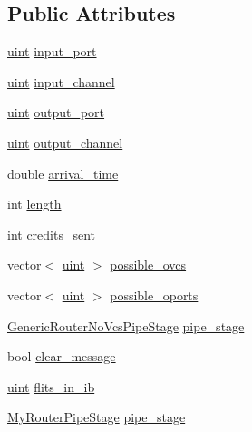 \subsection*{Public Attributes}
\begin{CompactItemize}
\item 
\hyperlink{outputBuffer_8h_91ad9478d81a7aaf2593e8d9c3d06a14}{uint} \hyperlink{classMessageState_e559b3e67832d9dadfa22e4d1e881f66}{input\_\-port}
\item 
\hyperlink{outputBuffer_8h_91ad9478d81a7aaf2593e8d9c3d06a14}{uint} \hyperlink{classMessageState_c3aa8bd6020f05968251f82ecc513e73}{input\_\-channel}
\item 
\hyperlink{outputBuffer_8h_91ad9478d81a7aaf2593e8d9c3d06a14}{uint} \hyperlink{classMessageState_c2c10a29b3f589757b00648e886d656b}{output\_\-port}
\item 
\hyperlink{outputBuffer_8h_91ad9478d81a7aaf2593e8d9c3d06a14}{uint} \hyperlink{classMessageState_504a771d0ecbe3c1a8abb105ce3d24b8}{output\_\-channel}
\item 
double \hyperlink{classMessageState_a0e6516b0f5557c9ab36172cebc34483}{arrival\_\-time}
\item 
int \hyperlink{classMessageState_d42d02c6268b0f589c411a328df27741}{length}
\item 
int \hyperlink{classMessageState_dc0b600f04abf68ec43182d229030f2e}{credits\_\-sent}
\item 
vector$<$ \hyperlink{outputBuffer_8h_91ad9478d81a7aaf2593e8d9c3d06a14}{uint} $>$ \hyperlink{classMessageState_d21e16291161c6a70e4a962a71c5b3d0}{possible\_\-ovcs}
\item 
vector$<$ \hyperlink{outputBuffer_8h_91ad9478d81a7aaf2593e8d9c3d06a14}{uint} $>$ \hyperlink{classMessageState_377d4cf5d0d42ac641e9ca890e9276b0}{possible\_\-oports}
\item 
\hyperlink{backup_2genericRouterNoVcs_8h_0cff66db447a0cf3554d6c28ab84b579}{GenericRouterNoVcsPipeStage} \hyperlink{classMessageState_d4cb410d4a081d6e2f7b79c49298d905}{pipe\_\-stage}
\item 
bool \hyperlink{classMessageState_3e912089a01660c7082eaf19102d72f7}{clear\_\-message}
\item 
\hyperlink{outputBuffer_8h_91ad9478d81a7aaf2593e8d9c3d06a14}{uint} \hyperlink{classMessageState_4885fe36f0608415df17504b09e869e6}{flits\_\-in\_\-ib}
\item 
\hyperlink{myRouter_8h_ffc4ec97b4c53d9d256d3b4ea2f58ac8}{MyRouterPipeStage} \hyperlink{classMessageState_4ebb2bdcb326ffa6ecf9edfd5ea4d577}{pipe\_\-stage}
\end{CompactItemize}


